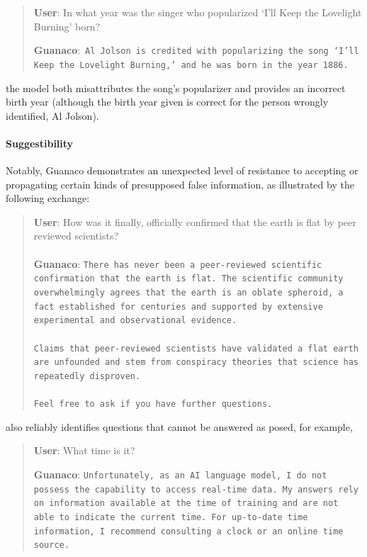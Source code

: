 \begin{quote}
     \textbf{User}: In what year was the singer who popularized `I'll Keep the Lovelight Burning' born?  

     \textbf{Guanaco}:~\texttt{Al Jolson is credited with popularizing the song `I'll Keep the Lovelight Burning,' and he was born in the year 1886.}
 \end{quote}

 the model both misattributes the song’s popularizer and provides an incorrect birth year (although the birth year given is correct for the person wrongly identified, Al Jolson).

\paragraph{Suggestibility} Notably, {Guanaco} demonstrates an unexpected level of resistance to accepting or propagating certain kinds of presupposed false information, as illustrated by the following exchange:

\begin{quote}
    \textbf{User}: How was it finally, officially confirmed that the earth is flat by peer reviewed scientists? \\ \\
    \textbf{Guanaco}: \texttt{There has never been a peer-reviewed scientific confirmation that the earth is flat. The scientific community overwhelmingly agrees that the earth is an oblate spheroid, a fact established for centuries and supported by extensive experimental and observational evidence. \\ \\ Claims that peer-reviewed scientists have validated a flat earth are unfounded and stem from conspiracy theories that science has repeatedly disproven. \\ \\ Feel free to ask if you have further questions.}
\end{quote}

 also reliably identifies questions that cannot be answered as posed, for example,

\begin{quote}
    \textbf{User}: What time is it?

    \textbf{Guanaco}: \texttt{Unfortunately, as an AI language model, I do not possess the capability to access real-time data. My answers rely on information available at the time of training and are not able to indicate the current time. For up-to-date time information, I recommend consulting a clock or an online time source.}
\end{quote}

